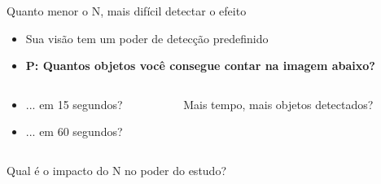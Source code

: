 \documentclass{beamer}
\begin{document}
\begin{frame}{\scriptsize Quanto menor o N, mais difícil detectar o efeito}
  \begin{itemize}
    \scriptsize
  \item Sua visão tem um poder de detecção predefinido
  \item {\bf P: Quantos objetos você consegue contar na imagem abaixo?}
  \end{itemize}

  \bigskip
  \begin{columns}
    \begin{column}{5cm}
      \begin{itemize}
        \scriptsize
      \item ... em 15 segundos?
      \item ... em 60 segundos?
      \end{itemize}
    \end{column}
    \begin{column}{5cm}
      \begin{exampleblock}{\scriptsize Mais tempo, mais objetos detectados?}
        \centering
      \end{exampleblock}
    \end{column}
  \end{columns}
\end{frame}

\begin{frame}
  \begin{center}
    Qual é o impacto do N no poder do estudo?
  \end{center}
\end{frame}
\end{document}
